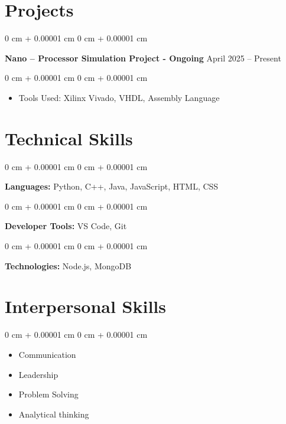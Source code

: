 \documentclass[10pt, letterpaper]{article}
\newenvironment{highlights}{
    \begin{itemize}[
        topsep=0.10 cm,
        parsep=0.10 cm,
        partopsep=0pt,
        itemsep=0pt,
        leftmargin=0 cm + 10pt
    ]
}{
    \end{itemize}
} %
\newenvironment{onecolentry}{
    \begin{adjustwidth}{
        0 cm + 0.00001 cm
    }{
        0 cm + 0.00001 cm
    }
}{
    \end{adjustwidth}
} %
\newenvironment{twocolentry}[2][]{
    \onecolentry
    \def\secondColumn{#2}
    \setcolumnwidth{\fill, 4.5 cm}
    \begin{paracol}{2}
}{
    \switchcolumn \raggedleft \secondColumn
    \end{paracol}
    \endonecolentry
} %
\begin{document}
    
    \section{Projects}



        
        \begin{twocolentry}{
            April 2025 – Present
        }
            \textbf{Nano – Processor Simulation Project - Ongoing}\end{twocolentry}

        \vspace{0.10 cm}
        \begin{onecolentry}
            \begin{highlights}
                \item Tools Used: Xilinx Vivado, VHDL, Assembly Language
            \end{highlights}
        \end{onecolentry}



    
    \section{Technical Skills}



        
        \begin{onecolentry}
            \textbf{Languages:} Python, C++, Java, JavaScript, HTML, CSS
        \end{onecolentry}

        \vspace{0.2 cm}

        \begin{onecolentry}
            \textbf{Developer Tools:} VS Code, Git
        \end{onecolentry}

        \vspace{0.2 cm}

        \begin{onecolentry}
            \textbf{Technologies:} Node.js, MongoDB
        \end{onecolentry}
    
    \section{Interpersonal Skills}



        
        \begin{onecolentry}
            \begin{highlights}
                \item Communication
                \item Leadership
                \item Problem Solving
                \item Analytical thinking
            \end{highlights}
        \end{onecolentry}
    
\end{document}
